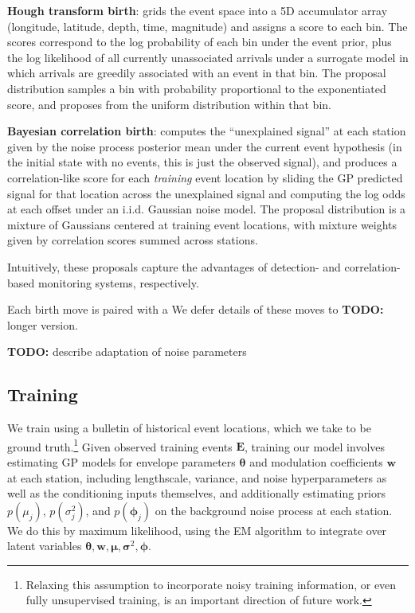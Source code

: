 \documentclass[twoside]{article} \usepackage{aistats2017}
\renewcommand{\v}[1]{\mathbf{#1}}
\newcommand{\todo}[1]{{\color{red} \textbf{TODO:} {#1}}}
\begin{document}
\textbf{Hough transform birth}: grids the event space into a 5D
  accumulator array (longitude, latitude, depth, time, magnitude) and
  assigns a score to each bin. The scores correspond to the log
  probability of each bin under the event prior, plus the log
  likelihood of all currently unassociated arrivals under a
  surrogate model in which arrivals are greedily associated with an
  event in that bin. The proposal distribution samples a bin with
  probability proportional to the exponentiated score, and proposes
  from the uniform distribution within that bin. 

\textbf{Bayesian correlation birth}: computes the ``unexplained
  signal'' at each station given by the noise process posterior mean under the current
  event hypothesis (in the initial state with no events, this is
  just the observed signal), and produces a
  correlation-like score for each {\em training} event location by sliding the GP
  predicted signal for that location across the unexplained signal and
  computing the log odds at each offset under an i.i.d. Gaussian noise
  model. The proposal distribution is a mixture of Gaussians centered
  at training event locations, with mixture weights given by correlation scores summed across stations. 

Intuitively, these proposals capture the advantages of detection- and
correlation-based monitoring systems, respectively. 

Each birth move is paired with a 
We defer details of these moves to \todo{longer
  version}. 

\todo{describe adaptation of noise parameters}

\subsection{Training}

We train using a bulletin of historical event locations, which we take to be ground
truth.\footnote{Relaxing this assumption to incorporate noisy training
  information, or even fully unsupervised training, is an important
  direction of future work.} Given observed training events $\v{E}$, training our model involves
  estimating GP models for envelope parameters $\v{\theta}$ and
  modulation coefficients $\v{w}$ at each station, including
  lengthscale, variance, and noise hyperparameters as well as the
  conditioning inputs themselves, and additionally estimating priors
  $p(\mu_j)$, $p(\sigma^2_j)$, and $p(\v{\phi}_j)$ on the background
  noise process at each station. We do this by maximum likelihood,
  using the EM algorithm \citep{dempster1977maximum} to integrate over
  latent variables $\v{\theta}, \v{w}, \v{\mu}, \v{\sigma}^2,
  \v{\phi}$. 
\end{document}
